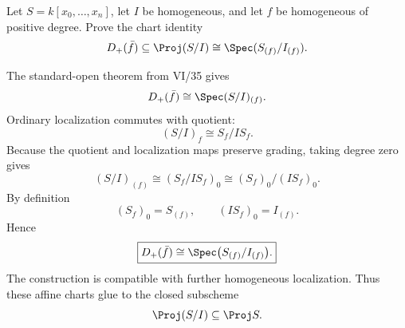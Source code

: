 \begin{problem}\label{prob:vi37-01}
Let \(S=k[x_0,\ldots,x_n]\), let \(I\) be homogeneous, and let \(f\) be homogeneous of positive degree. Prove the chart identity
\[
D_+(\bar f)\subseteq\Proj(S/I)\cong\Spec(S_{(f)}/I_{(f)}).
\]
\end{problem}

\ifdefined\FullProblemDossiers
\begin{solution}
The standard-open theorem from VI/35 gives
\[
D_+(\bar f)\cong\Spec (S/I)_{(f)}.
\]
Ordinary localization commutes with quotient:
\[
(S/I)_f\cong S_f/IS_f.
\]
Because the quotient and localization maps preserve grading, taking degree zero gives
\[
(S/I)_{(f)}
\cong
(S_f/IS_f)_0
\cong
(S_f)_0/(IS_f)_0.
\]
By definition
\[
(S_f)_0=S_{(f)},
\qquad
(IS_f)_0=I_{(f)}.
\]
Hence
\[
\boxed{
D_+(\bar f)
\cong
\Spec\bigl(S_{(f)}/I_{(f)}\bigr).
}
\]
The construction is compatible with further homogeneous localization. Thus these affine charts glue to the closed subscheme
\[
\Proj(S/I)\subseteq\Proj S.
\]
\end{solution}
\fi
